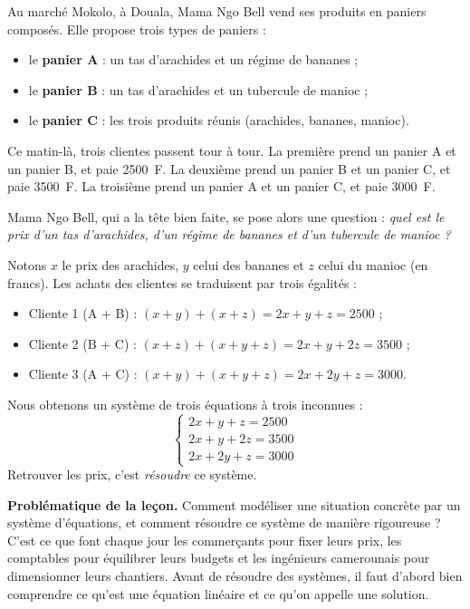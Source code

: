 \documentclass[11pt]{article}
\newcommand{\cle}[1]{{\popxbold\color{popdark}#1}}
\begin{document}
Au marché Mokolo, à Douala, Mama Ngo Bell vend ses produits en \cle{paniers} composés. Elle propose trois types de paniers :

\begin{itemize}
\item le \textbf{panier A} : un tas d'arachides et un régime de bananes ;
\item le \textbf{panier B} : un tas d'arachides et un tubercule de manioc ;
\item le \textbf{panier C} : les trois produits réunis (arachides, bananes, manioc).
\end{itemize}

Ce matin-là, trois clientes passent tour à tour. La première prend un panier A et un panier B, et paie \SI{2500}{F}. La deuxième prend un panier B et un panier C, et paie \SI{3500}{F}. La troisième prend un panier A et un panier C, et paie \SI{3000}{F}.

Mama Ngo Bell, qui a la tête bien faite, se pose alors une question : \emph{quel est le prix d'un tas d'arachides, d'un régime de bananes et d'un tubercule de manioc ?}

Notons $x$ le prix des arachides, $y$ celui des bananes et $z$ celui du manioc (en francs). Les achats des clientes se traduisent par trois égalités :
\begin{itemize}
\item Cliente 1 (A + B) : $(x+y) + (x+z) = 2x + y + z = 2500$ ;
\item Cliente 2 (B + C) : $(x+z) + (x+y+z) = 2x + y + 2z = 3500$ ;
\item Cliente 3 (A + C) : $(x+y) + (x+y+z) = 2x + 2y + z = 3000$.
\end{itemize}
Nous obtenons un \cle{système de trois équations à trois inconnues} :
\[
\begin{cases}
2x + y + z = 2500\\
2x + y + 2z = 3500\\
2x + 2y + z = 3000
\end{cases}
\]
Retrouver les prix, c'est \emph{résoudre} ce système.

\textbf{Problématique de la leçon.} Comment modéliser une situation concrète par un système d'équations, et comment résoudre ce système de manière rigoureuse ? C'est ce que font chaque jour les commerçants pour fixer leurs prix, les comptables pour équilibrer leurs budgets et les ingénieurs camerounais pour dimensionner leurs chantiers. Avant de résoudre des systèmes, il faut d'abord bien comprendre ce qu'est une \cle{équation linéaire} et ce qu'on appelle une \cle{solution}.
\end{document}
